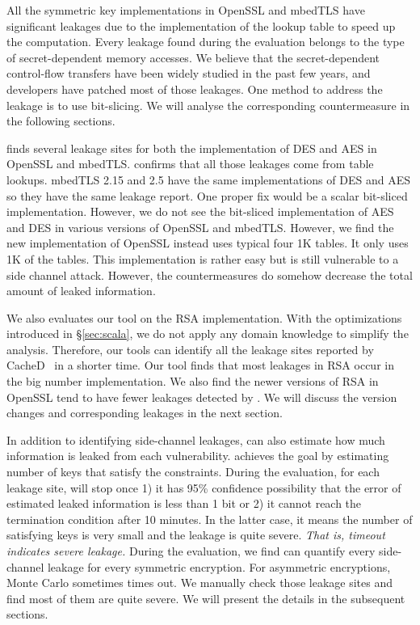 All the symmetric key implementations in OpenSSL and mbedTLS have significant
leakages due to the implementation of the lookup table to speed up the
computation. Every leakage found during the evaluation belongs to the type of
secret-dependent memory accesses. We believe that the secret-dependent
control-flow transfers have been widely studied in the past few years, and
developers have patched most of those leakages. One method to address the
leakage is to use bit-slicing. We will analyse the corresponding countermeasure
in the following sections.

\tool{} finds several leakage sites for both the implementation of DES and AES in
OpenSSL and mbedTLS\@. \tool{} confirms that all those leakages come from table
lookups. mbedTLS 2.15 and 2.5 have the same implementations of DES and AES so
they have the same leakage report. One proper fix would be a scalar bit-sliced
implementation. However, we do not see the bit-sliced implementation of AES and
DES in various versions of OpenSSL and mbedTLS\@. However, we find the new
implementation of OpenSSL instead uses typical four 1K tables. It only uses 1K
of the tables. This implementation is rather easy but is still vulnerable to a
side channel attack. However, the countermeasures do somehow decrease the total
amount of leaked information.

We also evaluates our tool on the RSA implementation. With the optimizations
introduced in \S\ref{sec:scala}, we do not apply any domain knowledge to
simplify the analysis. Therefore, our tools can identify all the leakage sites
reported by CacheD~\cite{203878} in a shorter time. Our tool finds that most
leakages in RSA occur in the big number implementation. We also find the newer
versions of RSA in OpenSSL tend to have fewer leakages detected by \tool{}. We
will discuss the version changes and corresponding leakages in the next section.

In addition to identifying side-channel leakages, \tool{} can also estimate how
much information is leaked from each vulnerability. \tool{} achieves the goal by
estimating number of keys that satisfy the constraints. During the evaluation,
for each leakage site, \tool{} will stop once 1) it has 95\% confidence
possibility that the error of estimated leaked information is less than 1 bit or
2) it cannot reach the termination condition after 10 minutes. In the latter
case, it means the number of satisfying keys is very small and the leakage is
quite severe. \emph{That is, timeout indicates severe leakage.}
\label{loc:timeout}
During the evaluation,
we find \tool{} can quantify every side-channel leakage for every symmetric
encryption. For asymmetric encryptions, Monte Carlo sometimes
times out. We manually check those leakage sites and find most of them are quite severe.
We will present the details in the subsequent sections.

